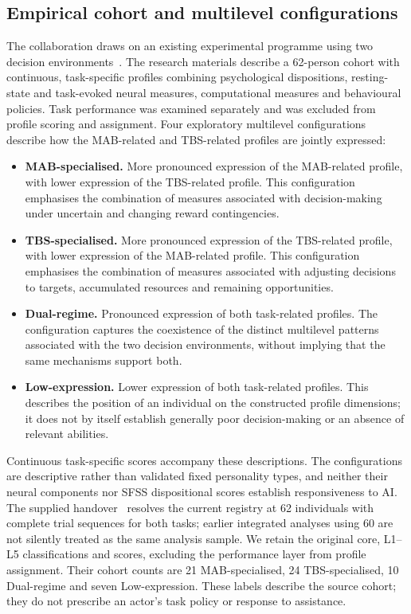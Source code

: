 \documentclass[11pt,a4paper]{article}
\begin{document}
\subsection{Empirical cohort and multilevel configurations}
The collaboration draws on an existing experimental programme using two decision environments~\cite{briefing,instructions}. The research materials describe a 62-person cohort with continuous, task-specific profiles combining psychological dispositions, resting-state and task-evoked neural measures, computational measures and behavioural policies. Task performance was examined separately and was excluded from profile scoring and assignment. Four exploratory multilevel configurations describe how the MAB-related and TBS-related profiles are jointly expressed:
\begin{itemize}
  \item \textbf{MAB-specialised.} More pronounced expression of the MAB-related profile, with lower expression of the TBS-related profile. This configuration emphasises the combination of measures associated with decision-making under uncertain and changing reward contingencies.
  \item \textbf{TBS-specialised.} More pronounced expression of the TBS-related profile, with lower expression of the MAB-related profile. This configuration emphasises the combination of measures associated with adjusting decisions to targets, accumulated resources and remaining opportunities.
  \item \textbf{Dual-regime.} Pronounced expression of both task-related profiles. The configuration captures the coexistence of the distinct multilevel patterns associated with the two decision environments, without implying that the same mechanisms support both.
  \item \textbf{Low-expression.} Lower expression of both task-related profiles. This describes the position of an individual on the constructed profile dimensions; it does not by itself establish generally poor decision-making or an absence of relevant abilities.
\end{itemize}
Continuous task-specific scores accompany these descriptions. The configurations are descriptive rather than validated fixed personality types, and neither their neural components nor SFSS dispositional scores establish responsiveness to AI. The supplied handover~\cite{handover} resolves the current registry at 62 individuals with complete trial sequences for both tasks; earlier integrated analyses using 60 are not silently treated as the same analysis sample. We retain the original core, L1--L5 classifications and scores, excluding the performance layer from profile assignment. Their cohort counts are 21 MAB-specialised, 24 TBS-specialised, 10 Dual-regime and seven Low-expression. These labels describe the source cohort; they do not prescribe an actor's task policy or response to assistance.
\end{document}
